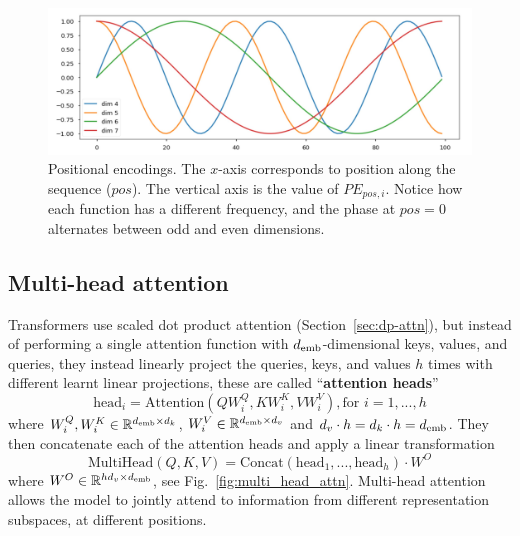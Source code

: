 \documentclass[11pt]{article}
\numberwithin{equation}{section}
\begin{document}
\begin{figure}
\begin{center}
\includegraphics[width=0.7\columnwidth]{../figures/pos_enc.jpg}  
\end{center}
\caption{Positional encodings. The $x$-axis corresponds to position along the sequence ($pos$). The vertical axis is the value of $PE_{pos, i}$. Notice how each function has a different frequency, and the phase at $pos=0$ alternates between odd and even dimensions.}
\label{fig:pos_enc}
\end{figure}

\subsection{Multi-head attention}
Transformers use scaled dot product attention (Section~\ref{sec:dp-attn}), but instead of performing a single attention function with $d_{\text{emb}}$-dimensional keys, values, and queries, they instead linearly project the queries, keys, and values $h$ times with different learnt linear projections, these are called ``\textbf{attention heads}''
\begin{equation}
\text{head}_i = \text{Attention}(QW_i^Q, KW_i^K, VW_i^V), \text{for } i = 1,...,h
\end{equation}
where $W_i^Q, W_i^K \in \mathbb{R}^{d_{\text{emb}} \times d_k}$, $W_i^V \in \mathbb{R}^{d_{\text{emb}} \times d_v}$ and $d_v \cdot h = d_k \cdot h = d_{\text{emb}}$. They then concatenate each of the attention heads and apply a linear transformation
\begin{equation}
\text{MultiHead}(Q, K, V) = \text{Concat}(\text{head}_1, ..., \text{head}_h) \cdot W^O
\end{equation}
where $W^O \in \mathbb{R}^{h d_v \times d_{\text{emb}}}$, see Fig.~\ref{fig:multi_head_attn}. Multi-head attention allows the model to jointly attend to information from different representation subspaces, at different positions. 
\end{document}
